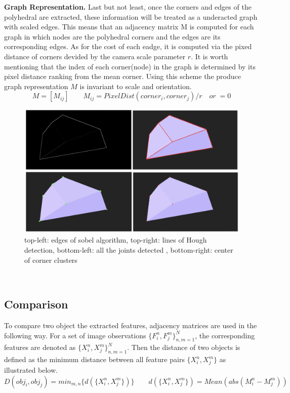 \documentclass[crop=false]{standalone}
\begin{document}
\noindent \textbf{Graph Representation.} Last but not least, once the corners and edges of the polyhedral are extracted, these information will be treated as a underacted graph with scaled edges. This means that an adjacency matrix M is computed for each graph in which nodes are the polyhedral corners and the edges are its corresponding edges. As for the cost of each eadge, it is computed via the pixed distance of corners devided by the camera scale parameter $r$. It is worth mentioning that the index of each corner(node) in the graph is determined by its pixel distance ranking from the mean corner. Using this scheme the produce graph representation $M$ is invariant to scale and orientation.
$$
M = [M_{ij}] \qquad M_{ij} = PixelDist(corner_i, corner_j)/r \quad  or \; =0
$$
\begin{figure}[t]
\centering{}\includegraphics[width=0.95\columnwidth]{figure/ff.png}
\caption{\label{fig:ff}top-left: edges of sobel algorithm, top-right: lines of Hough detection, bottom-left: all the joints detected , bottom-right: center of corner clusters}
\end{figure}
\\


\subsection{Comparison\label{subsection:network}}
To compare two object the extracted features, adjacency matrices are used in the following way. For a set of image observations $\{ F_i^n, F_j^m \}_{n, m = 1}^{N}$, the corresponding features are denoted as $\{ X_i^n, X_j^m \}_{n, m = 1}^{N}$. Then the distance of two objects is defined as the minimum distance between all feature pairs $\{ X_i^n, X_j^m \}$ as illustrated below.
$$
D(obj_i, obj_j) = min_{m, n}\{d(\{ X_i^n, X_j^m \})\} \qquad d(\{ X_i^n, X_j^m \}) = Mean(abs(M_i^n - M_j^m))
$$
\end{document}
